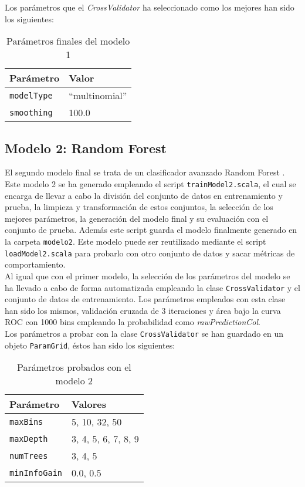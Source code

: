 \documentclass[12pt]{article}
\begin{document}
Los parámetros que el \textit{CrossValidator} ha seleccionado como los mejores han sido los siguientes:

\begin{table}[H]
    \centering
    \begin{tabular}{|p{}|p{}|}
        \hline Parámetro & Valor \\ \hline
        \texttt{modelType} & ``multinomial'' \\ \hline
        \texttt{smoothing} & 100.0 \\ \hline
    \end{tabular}
    \caption{Parámetros finales del modelo 1}
    \label{tab:final_m1}
\end{table}

\subsection{Modelo 2: Random Forest}
El segundo modelo final se trata de un clasificador avanzado Random Forest \cite{random_forest_classifier}. Este modelo 2 se ha generado empleando el script \texttt{trainModel2.scala}, el cual se encarga de llevar a cabo la división del conjunto de datos en entrenamiento y prueba, la limpieza y transformación de estos conjuntos, la selección de los mejores parámetros, la generación del modelo final y su evaluación con el conjunto de prueba. Además este script guarda el modelo finalmente generado en la carpeta \texttt{modelo2}. Este modelo puede ser reutilizado mediante el script \texttt{loadModel2.scala} para probarlo con otro conjunto de datos y sacar métricas de comportamiento.\\

Al igual que con el primer modelo, la selección de los parámetros del modelo se ha llevado a cabo de forma automatizada empleando la clase \texttt{CrossValidator} y el conjunto de datos de entrenamiento. Los parámetros empleados con esta clase han sido los mismos, validación cruzada de 3 iteraciones y área bajo la curva ROC con 1000 bins empleando la probabilidad como \textit{rawPredictionCol}.\\

Los parámetros a probar con la clase \texttt{CrossValidator} se han guardado en un objeto \texttt{ParamGrid}, éstos han sido los siguientes:

\begin{table}[H]
    \centering
    \begin{tabular}{|p{}|p{}|}
        \hline Parámetro & Valores \\ \hline
        \texttt{maxBins} & 5, 10, 32, 50 \\ \hline
        \texttt{maxDepth} & 3, 4, 5, 6, 7, 8, 9 \\ \hline
        \texttt{numTrees} & 3, 4, 5 \\ \hline
        \texttt{minInfoGain} & 0.0, 0.5 \\ \hline
    \end{tabular}
    \caption{Parámetros probados con el modelo 2}
    \label{tab:cross_m2}
\end{table}
\end{document}
